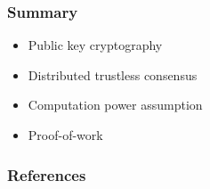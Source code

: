 \documentclass{beamer}
\begin{document}
\begin{frame}
\frametitle{Summary}

\begin{itemize}
  \item Public key cryptography
  \item Distributed trustless consensus
  \item Computation power assumption
  \item Proof-of-work
\end{itemize}

\end{frame}

\begin{frame}
\frametitle{References}

\end{frame}
\end{document}

